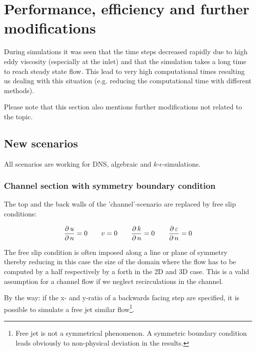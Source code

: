 \chapter{Performance, efficiency and further modifications} %
\label{cha:performance_efficiency_and_further_modifications}

During simulations it was seen that the time steps decreased rapidly due to high eddy viscosity (especially at the inlet) and that the simulation takes a long time to reach steady state flow. This lead to very high computational times resulting us dealing with this situation (e.g. reducing the computational time with different methods).

\noii Please note that this section also mentions further modifications not related to the topic.
 
\section{New scenarios} %
\label{sec:new_scenarios}

All scenarios are working for DNS, algebraic and $k$-$\epsilon$-simulations.



\subsection*{Channel section with symmetry boundary condition} %
\label{sub:channel_section_with_symmetry_boundary_condition}

The top and the back walls of the 'channel'-scenario are replaced by free slip conditions:

\begin{equation}
\frac{\partial\,u}{\partial\,n}=0
\qquad
v = 0
\qquad
\frac{\partial\,k}{\partial\,n}=0
\qquad
\frac{\partial\,\varepsilon}{\partial\,n}=0
\end{equation}  

\noii The free slip condition is often imposed along a line or plane of symmetry  thereby reducing in this case the size of the domain where the flow has to be computed by a half respectively by a forth in the 2D and 3D case. This is a valid assumption for a channel flow if we neglect recirculations in the channel.

\noii By the way: if the x- and y-ratio of a backwards facing step are specified, it is possible to simulate a free jet similar flow\footnote{Free jet is not a symmetrical phenomenon. A symmetric boundary condition leads obviously to non-physical deviation in the results.}.

